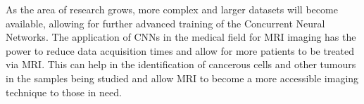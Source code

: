 \documentclass[14pt]{extreport}
\begin{document}
        As the area of research grows, more complex and larger datasets will become available, allowing for further advanced training of the Concurrent Neural Networks. The application of CNNs in the medical field for MRI imaging has the power to reduce data acquisition times and allow for more patients to be treated via MRI. This can help in the identification of cancerous cells and other tumours in the samples being studied and allow MRI to become a more accessible imaging technique to those in need.




    
    
\end{document}

